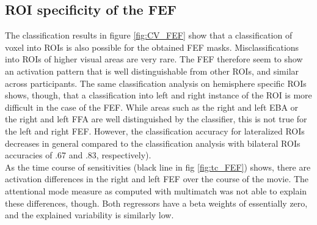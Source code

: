\documentclass[a4paper, 12pt]{scrreprt}
\begin{document}
\subsection{ROI specificity of the FEF}
The classification results in figure \ref{fig:CV_FEF} show that a classification of voxel into ROIs is also possible for the obtained FEF masks. Misclassifications into ROIs of higher visual areas are very rare. The FEF therefore seem to show an activation pattern that is well distinguishable from other ROIs, and similar across participants. The same classification analysis on hemisphere specific ROIs shows, though, that a classification into left and right instance of the ROI is more difficult in the case of the FEF. While areas such as the right and left EBA or the right and left FFA are well distinguished by the classifier, this is not true for the left and right FEF. However, the classification accuracy for lateralized ROIs decreases in general compared to the classification analysis with bilateral ROIs accuracies of .67 and .83, respectively).\\
As the time course of sensitivities (black line in fig \ref{fig:tc_FEF}) shows, there are activation differences in the right and left FEF over the course of the movie. The attentional mode measure as computed with multimatch was not able to explain these differences, though. Both regressors have a beta weights of essentially zero, and the explained variability is similarly low. \\
\end{document}
